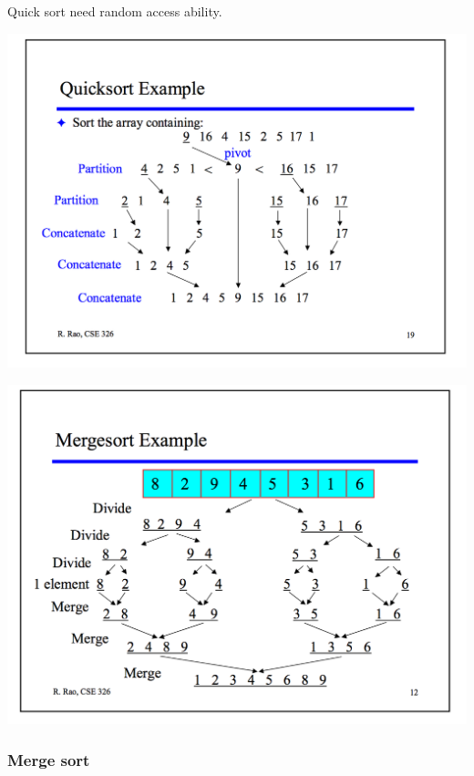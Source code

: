 \documentclass[a4paper,11pt,twoside]{book}
\begin{document}
\par Quick sort need random access ability.  

\begin{center}
	\includegraphics[scale=0.45]{pics/quick_sort.png} 
\end{center}

\begin{center}
	\includegraphics[scale=0.45]{pics/merge_sort.png}
\end{center}




\subsubsection{Merge sort}
\end{document}
